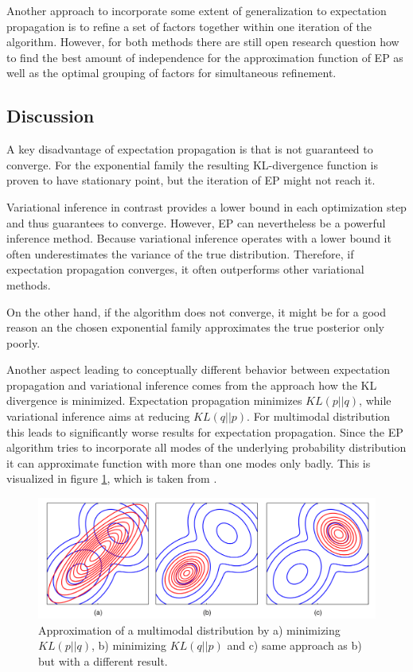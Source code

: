 \documentclass{sigkdd}
\begin{document}
Another approach to incorporate some extent of generalization to expectation propagation is to refine a set of factors together within one iteration of the algorithm. However, for both methods there are still open research question how to find the best amount of independence for the approximation function of EP as well as the optimal grouping of factors for simultaneous refinement.

\subsection{Discussion}
A key disadvantage of expectation propagation is that is not guaranteed to converge. For the exponential family the resulting KL-divergence function is proven to have stationary point, but the iteration of EP might not reach it.

Variational inference in contrast provides a lower bound in each optimization step and thus guarantees to converge. However, EP can nevertheless be a powerful inference method. Because variational inference operates with a lower bound it often underestimates the variance of the true distribution. Therefore, if expectation propagation converges, it often outperforms other variational methods.

On the other hand, if the algorithm does not converge, it might be for a good reason an the chosen exponential family approximates the true posterior only poorly.

Another aspect leading to conceptually different behavior between expectation propagation and variational inference comes from the approach how the KL divergence is minimized. Expectation propagation minimizes $KL(p||q)$, while variational inference aims at reducing $KL(q||p)$. For multimodal distribution this leads to significantly worse results for expectation propagation. Since the EP algorithm tries to incorporate all modes of the underlying probability distribution it can approximate function with more than one modes only badly. This is visualized in figure \ref{fig:multimodal}, which is taken from \cite{bishop2006prml}.

\begin{figure}[h]
	\begin{center}
		\includegraphics[scale=0.12]{multimodal_approximation.png}
		\caption{Approximation of a multimodal distribution by a) minimizing $KL(p||q)$, b) minimizing $KL(q||p)$ and c) same approach as b) but with a different result.}\label{fig:multimodal}
	\end{center}
\end{figure}
\end{document}
